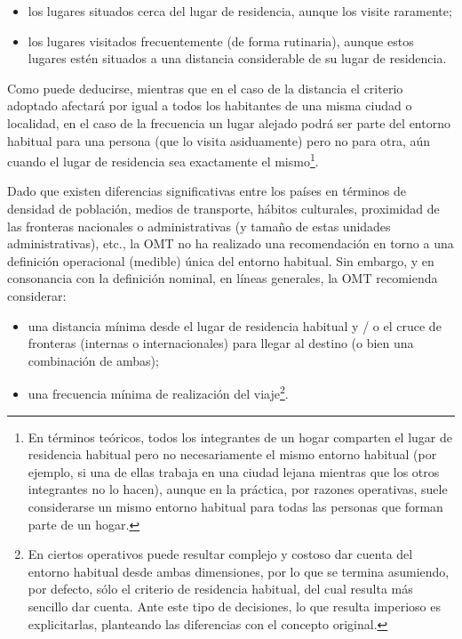 \documentclass[
  openany]{book}
\begin{document}
\begin{itemize}
\item
  los lugares situados cerca del lugar de residencia, aunque los visite raramente;
\item
  los lugares visitados frecuentemente (de forma rutinaria), aunque estos lugares estén situados a una distancia considerable de su lugar de residencia.
\end{itemize}

Como puede deducirse, mientras que en el caso de la distancia el criterio adoptado afectará por igual a todos los habitantes de una misma ciudad o localidad, en el caso de la frecuencia un lugar alejado podrá ser parte del entorno habitual para una persona (que lo visita asiduamente) pero no para otra, aún cuando el lugar de residencia sea exactamente el mismo\footnote{En términos teóricos, todos los integrantes de un hogar comparten el lugar de residencia habitual pero no necesariamente el mismo entorno habitual (por ejemplo, si una de ellas trabaja en una ciudad lejana mientras que los otros integrantes no lo hacen), aunque en la práctica, por razones operativas, suele considerarse un mismo entorno habitual para todas las personas que forman parte de un hogar.}.

Dado que existen diferencias significativas entre los países en términos de densidad de población, medios de transporte, hábitos culturales, proximidad de las fronteras nacionales o administrativas (y tamaño de estas unidades administrativas), etc., la OMT no ha realizado una recomendación en torno a una definición operacional (medible) única del entorno habitual. Sin embargo, y en consonancia con la definición nominal, en líneas generales, la OMT recomienda considerar:

\begin{itemize}
\item
  una distancia mínima desde el lugar de residencia habitual y / o el cruce de fronteras (internas o internacionales) para llegar al destino (o bien una combinación de ambas);
\item
  una frecuencia mínima de realización del viaje\footnote{En ciertos operativos puede resultar complejo y costoso dar cuenta del entorno habitual desde ambas dimensiones, por lo que se termina asumiendo, por defecto, sólo el criterio de residencia habitual, del cual resulta más sencillo dar cuenta. Ante este tipo de decisiones, lo que resulta imperioso es explicitarlas, planteando las diferencias con el concepto original.}.
\end{itemize}
\end{document}
